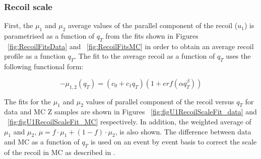 \clearpage
 
\subsubsection{Recoil scale}\label{sec:WBoson_Analysis_Rscale}

First, the $\mu_{1}$ and  $\mu_{2}$ average values of the parallel component of the recoil ($u_{1}$) is parametrised as a function of  $q_{T}$ from the fits shown in Figures ~\ref{fig:RecoilFitsData} and ~\ref{fig:RecoilFitsMC} in order to obtain an average recoil profile as a function $q_{T}$. The fit to the average recoil as a function of $q_{T}$ uses the following functional form: 

\begin{equation}\label{eq:equparparam} 
-\mu_{1,2}(q_{T}) = (c_{0} + c_{1}q_{T})(1 + erf(\alpha q_{T}^{\beta}))
\end{equation}

The fits for the $\mu_{1}$ and  $\mu_{2}$ values of parallel component of the recoil versus $q_{T}$ for data and MC Z samples are shown in Figures ~\ref{fig:figU1RecoilScaleFit_data} and ~\ref{fig:figU1RecoilScaleFit_MC} respectively. In addition, the weighted average of $\mu_{1}$ and  $\mu_{2}$, $\mu = f \cdot \mu_{1} + (1 - f) \cdot \mu_{2}$, is also shown. The difference between data and MC as a function of $q_{T}$ is used on an event by event basis to correct the scale of the recoil in MC as described in .

